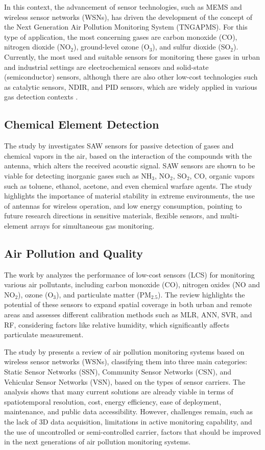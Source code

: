 \documentclass[conference]{IEEEtran}
\begin{document}
In this context, the advancement of sensor technologies, such as MEMS and wireless sensor networks (WSNs), has driven the development of the concept of the Next Generation Air Pollution Monitoring System (TNGAPMS). For this type of application, the most concerning gases are carbon monoxide (CO), nitrogen dioxide (NO$_2$), ground-level ozone (O$_3$), and sulfur dioxide (SO$_2$). Currently, the most used and suitable sensors for monitoring these gases in urban and industrial settings are electrochemical sensors and solid-state (semiconductor) sensors, although there are also other low-cost technologies such as catalytic sensors, NDIR, and PID sensors, which are widely applied in various gas detection contexts \cite{yi_2015_a}.

\subsection{Chemical Element Detection}

The study by \cite{devkota_2017_saw} investigates SAW sensors for passive detection of gases and chemical vapors in the air, based on the interaction of the compounds with the antenna, which alters the received acoustic signal. SAW sensors are shown to be viable for detecting inorganic gases such as NH$_3$, NO$_2$, SO$_2$, CO, organic vapors such as toluene, ethanol, acetone, and even chemical warfare agents.
The study highlights the importance of material stability in extreme environments, the use of antennas for wireless operation, and low energy consumption, pointing to future research directions in sensitive materials, flexible sensors, and multi-element arrays for simultaneous gas monitoring.

\subsection{Air Pollution and Quality}

The work by \cite{karagulian_2019_review} analyzes the performance of low-cost sensors (LCS) for monitoring various air pollutants, including carbon monoxide (CO), nitrogen oxides (NO and NO$_2$), ozone (O$_3$), and particulate matter (PM$_{2.5}$). The review highlights the potential of these sensors to expand spatial coverage in both urban and remote areas and assesses different calibration methods such as MLR, ANN, SVR, and RF, considering factors like relative humidity, which significantly affects particulate measurement.

The study by \cite{yi_2015_a} presents a review of air pollution monitoring systems based on wireless sensor networks (WSNs), classifying them into three main categories: Static Sensor Networks (SSN), Community Sensor Networks (CSN), and Vehicular Sensor Networks (VSN), based on the types of sensor carriers. The analysis shows that many current solutions are already viable in terms of spatiotemporal resolution, cost, energy efficiency, ease of deployment, maintenance, and public data accessibility. However, challenges remain, such as the lack of 3D data acquisition, limitations in active monitoring capability, and the use of uncontrolled or semi-controlled carrier, factors that should be improved in the next generations of air pollution monitoring systems.
\end{document}
